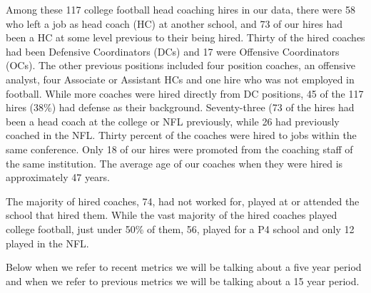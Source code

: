 \documentclass[
  12pt]{article}
\begin{document}
Among these 117 college football head coaching hires in our data, there
were 58 who left a job as head coach (HC) at another school, and 73 of
our hires had been a HC at some level previous to their being hired.
Thirty of the hired coaches had been Defensive Coordinators (DCs) and 17
were Offensive Coordinators (OCs). The other previous positions included
four position coaches, an offensive analyst, four Associate or Assistant
HCs and one hire who was not employed in football. While more coaches
were hired directly from DC positions, 45 of the 117 hires (38\%) had
defense as their background. Seventy-three (73 of the hires had been a
head coach at the college or NFL previously, while 26 had previously
coached in the NFL. Thirty percent of the coaches were hired to jobs
within the same conference. Only 18 of our hires were promoted from the
coaching staff of the same institution. The average age of our coaches
when they were hired is approximately 47 years.

The majority of hired coaches, 74, had not worked for, played at or
attended the school that hired them. While the vast majority of the
hired coaches played college football, just under 50\% of them, 56,
played for a P4 school and only 12 played in the NFL.

Below when we refer to recent metrics we will be talking about a five
year period and when we refer to previous metrics we will be talking
about a 15 year period.
\end{document}
